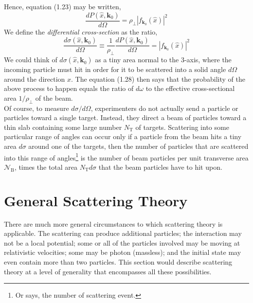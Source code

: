 \documentclass[12pt]{article}
\numberwithin{equation}{section}
\begin{document}
Hence, equation (1.23) may be written,
\begin{equation}
    \frac{dP(\hat{x}, \mathbf{k}_{0})}{d\Omega} = \rho_{\perp}\left|f_{\mathbf{k}_{0}}(\hat{x})\right|^2
\end{equation}
We define the \textit{differential cross-section} as the ratio,
\begin{equation}
    \frac{d\sigma(\hat{x}, \mathbf{k}_{0})}{d\Omega} \equiv \frac{1}{\rho_{\perp}}\frac{dP(\hat{x}, \mathbf{k}_0)}{d\Omega} = \left|f_{\mathbf{k}_0}(\hat{x})\right|^2
\end{equation}
We could think of $d\sigma(\hat{x}, \mathbf{k}_0)$ as a tiny area normal to the 3-axis, where the incoming particle must hit in order for it to be scattered into a solid angle $d\Omega$ around the direction $\hat{x}$.
The equation (1.28) then says that the probability of the above process to happen equals the ratio of $d\omega$ to the effective cross-sectional area $1/\rho_{\perp}$ of the beam.
\\\indent Of course, to measure $d\sigma/d\Omega$, experimenters do not actually send a particle or particles toward a single target. 
Instead, they direct a beam of particles toward a thin slab containing some large number $N_{\text{T}}$ of targets.
Scattering into some particular range of angles can occur only if a particle from the beam hits a tiny area $d\sigma$ around one of the targets, then the number of particles that are scattered into this range of angles\footnote{Or says, the number of scattering event.} is the number of beam particles per unit transverse area $\mathcal{N}_{\text{B}}$, times the total area $N_{\text{T}}d\sigma$ that the beam particles have to hit upon.
\section{General Scattering Theory}
There are much more general circumstances to which scattering theory is applicable.
The scattering can produce additional particles; the interaction may not be a local potential; some or all of the particles involved may be moving at relativistic velocities; some may be photon (massless); and the initial state may even contain more than two particles.
This section would describe scattering theory at a level of generality that encompasses all these possibilities.
\end{document}
